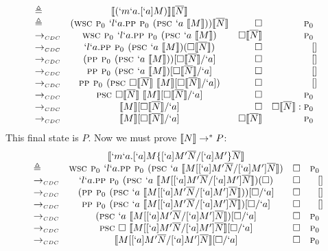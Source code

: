\begin{Proof}
\[\begin{array}{@{}lcrr}
  \triangleq & \tr{(`m`a.[`a]M)}\tr{\mult{N}} \\
  \triangleq & (\wsc \gp `l`a.\pp \gp (\psc `a\ \tr{M})) \tr{\mult{N}} & \square                & \gp \\
  \tocdc\    & \wsc \gp `l`a.\pp \gp (\psc `a\ \tr{M})                 & \square \tr{\mult{N}}  & \gp \\
  \tocdc\    & `l`a.\pp \gp (\psc `a\ \tr{M})(\square \tr{\mult{N}})   & \square                & [] \\
  \tocdc\    & (\pp \gp (\psc `a\ \tr{M}))[\square \tr{\mult{N}}/`a]   & \square                & [] \\
  \tocdc\    & \pp \gp (\psc `a\ \tr{M})[\square \tr{\mult{N}}/`a]     & \square                & [] \\
  \tocdc\    & \pp \gp (\psc \square \tr{\mult{N}}\ \tr{M}[\square \tr{\mult{N}}/`a]) & \square & [] \\
  \tocdc\    & \psc \square \tr{\mult{N}}\ \tr{M}[\square \tr{\mult{N}}/`a] & \square  & \gp \\
  \tocdc\    & \tr{M}[\square \tr{\mult{N}}/`a] & \square & \square \tr{\mult{N}}:\gp \\
  \tocdc\    & \tr{M}[\square \tr{\mult{N}}/`a] & \square \tr{\mult{N}} & \gp \\
\end{array}
\]
This final state is $P$. Now we must prove $\llbracket N \rrbracket \to^{*} P$:
\[
\begin{array}{lcrr}
             & \tr{`m`a.[`a]M\{[`a]M'\mult{N}/[`a]M'\}\mult{N}} \\
  \triangleq & \wsc \gp `l`a.\pp \gp (\psc `a\ \tr{M[[`a]M'\mult{N}/[`a]M']\mult{N}}) & \square & \gp \\
  \tocdc\    & `l`a.\pp \gp (\psc `a\ \tr{M[[`a]M'\mult{N}/[`a]M']\mult{N}})(\square) & \square & [] \\
  \tocdc\    & (\pp \gp (\psc `a\ \tr{M[[`a]M'\mult{N}/[`a]M']\mult{N}}))[\square/`a] & \square & [] \\
  \tocdc\    & \pp \gp (\psc `a\ \tr{M[[`a]M'\mult{N}/[`a]M']\mult{N}})[\square/`a]   & \square & [] \\
  \tocdc\    & (\psc `a\ \tr{M[[`a]M'\mult{N}/[`a]M']\mult{N}})[\square/`a]           & \square & \gp \\
  \tocdc\    & \psc \square\ \tr{M[[`a]M'\mult{N}/[`a]M']\mult{N}}[\square/`a]        & \square & \gp \\
  \tocdc\    & \tr{M[[`a]M'\mult{N}/[`a]M']\mult{N}}[\square/`a]  & \square           & \gp \\

\end{array}\]
\end{Proof}

